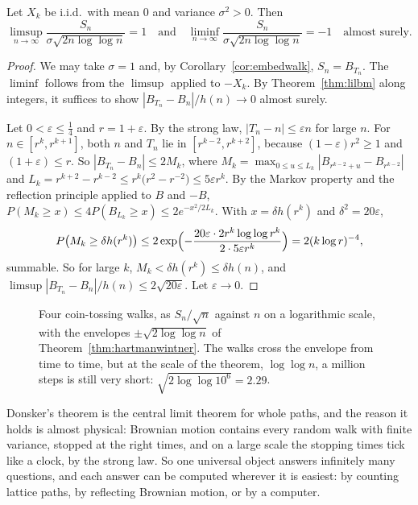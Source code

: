 \begin{theorem}\label{thm:hartmanwintner}
Let $X_k$ be i.i.d.\ with mean $0$ and variance $\sigma^2>0$. Then
\[
\limsup_{n\to\infty}\frac{S_n}{\sigma\sqrt{2n\log\log n}}=1\quad\text{and}\quad\liminf_{n\to\infty}\frac{S_n}{\sigma\sqrt{2n\log\log n}}=-1\quad\text{almost surely.}
\]
\end{theorem}
\begin{proof}
We may take $\sigma=1$ and, by Corollary~\ref{cor:embedwalk}, $S_n=B_{T_n}$. The $\liminf$ follows from the $\limsup$ applied to $-X_k$. By Theorem~\ref{thm:lilbm} along integers, it
suffices to show $|B_{T_n}-B_n|/h(n)\to0$ almost surely.

Let $0<\varepsilon\le\frac14$ and $r=1+\varepsilon$. By the strong law, $|T_n-n|\le\varepsilon n$ for large $n$. For $n\in[r^k,r^{k+1}]$, both $n$ and $T_n$ lie in $[r^{k-2},r^{k+2}]$,
because $(1-\varepsilon)r^2\ge1$ and $(1+\varepsilon)\le r$. So $|B_{T_n}-B_n|\le2M_k$, where $M_k=\max_{0\le u\le L_k}|B_{r^{k-2}+u}-B_{r^{k-2}}|$ and $L_k=r^{k+2}-r^{k-2}\le
r^k\bigl(r^2-r^{-2}\bigr)\le5\varepsilon r^k$. By the Markov property and the reflection principle applied to $B$ and $-B$, $P(M_k\ge x)\le4P(B_{L_k}\ge x)\le2e^{-x^2/2L_k}$. With
$x=\delta h(r^k)$ and $\delta^2=20\varepsilon$,
\[
P\bigl(M_k\ge\delta h(r^k)\bigr)\le2\exp\Bigl(-\frac{20\varepsilon\cdot2r^k\log\log r^k}{2\cdot5\varepsilon r^k}\Bigr)=2(k\log r)^{-4},
\]
summable. So for large $k$, $M_k<\delta h(r^k)\le\delta h(n)$, and $\limsup|B_{T_n}-B_n|/h(n)\le2\sqrt{20\varepsilon}$. Let $\varepsilon\to0$.
\end{proof}

\begin{figure}[ht]
\centering{}
\caption{Four coin-tossing walks, as $S_n/\sqrt n$ against $n$ on a logarithmic scale, with the envelopes $\pm\sqrt{2\log\log n}$ of Theorem~\ref{thm:hartmanwintner}. The
walks cross the envelope from time to time, but at the scale of the theorem, $\log\log n$, a million steps is still very short: $\sqrt{2\log\log10^6}=2.29$.}
\label{fig:lil}
\end{figure}

\begin{beauty}
Donsker's theorem is the central limit theorem for whole paths, and the reason it holds is almost physical: Brownian motion contains every random walk with finite variance,
stopped at the right times, and on a large scale the stopping times tick like a clock, by the strong law. So one universal object answers infinitely many questions, and each
answer can be computed wherever it is easiest: by counting lattice paths, by reflecting Brownian motion, or by a computer.
\end{beauty}

